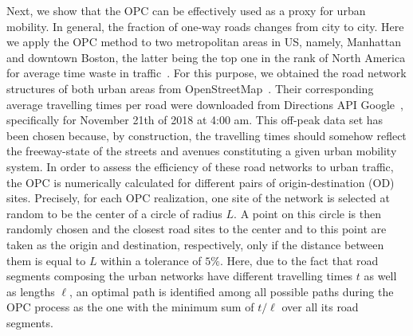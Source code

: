 \documentclass[aps,prl,twocolumn,showpacs,
superscriptaddress,floatfix, 10pt]{revtex4-1}
\begin{document}
Next, we show that the OPC can be effectively used as a proxy for urban mobility. 
In general, the fraction of one-way roads changes from city to city. Here we
apply the OPC method to two metropolitan areas in US, namely, Manhattan and
downtown Boston, the latter being the top one in the rank of North America for
average time waste in traffic~\cite{GlobalTrafficReport2018}. For this purpose,
we obtained the road network structures of both urban areas from
OpenStreetMap~\cite{OpenStreetMap}. Their corresponding average travelling times
per road were downloaded from Directions API Google~\cite{GoogleDirections},
specifically for November 21th of 2018 at 4:00 am. This off-peak data set has
been chosen because, by construction, the travelling times should somehow
reflect the freeway-state of the streets and avenues constituting a given urban
mobility system. In order to assess the efficiency of these road networks to
urban traffic, the OPC is numerically calculated for different pairs of
origin-destination (OD) sites. Precisely, for each OPC realization, one site of
the network is selected at random to be the center of a circle of radius $L$. A
point on this circle is then randomly chosen and the closest road sites to the
center and to this point are taken as the origin and destination, respectively,
only if the distance between them is equal to $L$ within a tolerance of $5\%$.
Here, due to the fact that road segments composing the urban networks have
different travelling times $t$ as well as lengths $\ell$, an optimal path is
identified among all possible paths during the OPC process as the one with the
minimum sum of $t/\ell$ over all its road segments.
	
\end{document}
